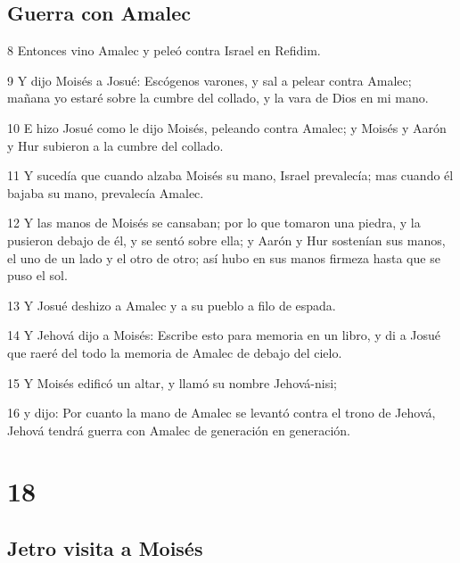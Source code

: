 \section*{Guerra con Amalec}

\par 8 Entonces vino Amalec y peleó contra Israel en Refidim.
\par 9 Y dijo Moisés a Josué: Escógenos varones, y sal a pelear contra Amalec; mañana yo estaré sobre la cumbre del collado, y la vara de Dios en mi mano.
\par 10 E hizo Josué como le dijo Moisés, peleando contra Amalec; y Moisés y Aarón y Hur subieron a la cumbre del collado.
\par 11 Y sucedía que cuando alzaba Moisés su mano, Israel prevalecía; mas cuando él bajaba su mano, prevalecía Amalec.
\par 12 Y las manos de Moisés se cansaban; por lo que tomaron una piedra, y la pusieron debajo de él, y se sentó sobre ella; y Aarón y Hur sostenían sus manos, el uno de un lado y el otro de otro; así hubo en sus manos firmeza hasta que se puso el sol.
\par 13 Y Josué deshizo a Amalec y a su pueblo a filo de espada.
\par 14 Y Jehová dijo a Moisés: Escribe esto para memoria en un libro, y di a Josué que raeré del todo la memoria de Amalec de debajo del cielo.
\par 15 Y Moisés edificó un altar, y llamó su nombre Jehová-nisi;
\par 16 y dijo: Por cuanto la mano de Amalec se levantó contra el trono de Jehová, Jehová tendrá guerra con Amalec de generación en generación.

\chapter{18}

\section*{Jetro visita a Moisés}

